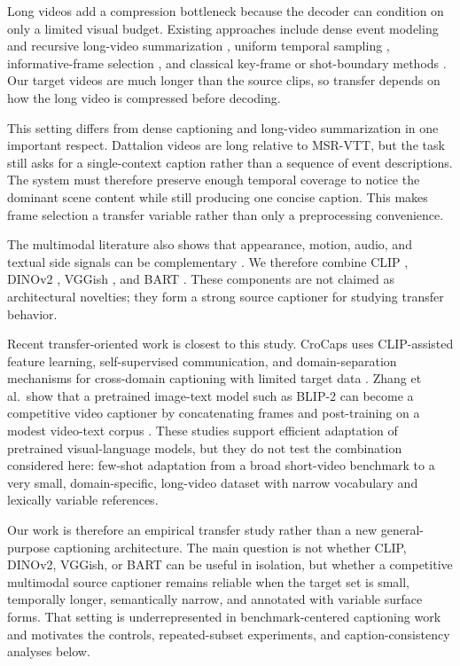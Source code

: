 \documentclass[pdflatex,sn-mathphys-num]{sn-jnl}
\theoremstyle{thmstyleone}
\theoremstyle{thmstyletwo}
\theoremstyle{thmstylethree}
\begin{document}
Long videos add a compression bottleneck because the decoder can condition on only a limited visual budget. Existing approaches include dense event modeling and recursive long-video summarization \cite{Mun_2019_CVPR,yang2023vid2seq,islam2024hourvideo}, uniform temporal sampling \cite{zhou2018maskedtransformer,Mun_2019_CVPR}, informative-frame selection \cite{chen2018lessismore}, and classical key-frame or shot-boundary methods \cite{KFE,shi2017KFE,shotboundary}. Our target videos are much longer than the source clips, so transfer depends on how the long video is compressed before decoding.

This setting differs from dense captioning and long-video summarization in one important respect. Dattalion videos are long relative to MSR-VTT, but the task still asks for a single-context caption rather than a sequence of event descriptions. The system must therefore preserve enough temporal coverage to notice the dominant scene content while still producing one concise caption. This makes frame selection a transfer variable rather than only a preprocessing convenience.

The multimodal literature also shows that appearance, motion, audio, and textual side signals can be complementary \cite{Ramanishka2016,lee2018,iashin2020densevidcap,zhao2022hierarchical,bhooshan2022multimodaltransformer,wang2023threestream}. We therefore combine CLIP \cite{radford2021clip}, DINOv2 \cite{oquab2024dinov2}, VGGish \cite{DBLP_VGGish}, and BART \cite{lewis2020bart}. These components are not claimed as architectural novelties; they form a strong source captioner for studying transfer behavior.

Recent transfer-oriented work is closest to this study. CroCaps uses CLIP-assisted feature learning, self-supervised communication, and domain-separation mechanisms for cross-domain captioning with limited target data \cite{xu2025crocaps}. Zhang et al.\ show that a pretrained image-text model such as BLIP-2 can become a competitive video captioner by concatenating frames and post-training on a modest video-text corpus \cite{zhang2025pretrained}. These studies support efficient adaptation of pretrained visual-language models, but they do not test the combination considered here: few-shot adaptation from a broad short-video benchmark to a very small, domain-specific, long-video dataset with narrow vocabulary and lexically variable references.

Our work is therefore an empirical transfer study rather than a new general-purpose captioning architecture. The main question is not whether CLIP, DINOv2, VGGish, or BART can be useful in isolation, but whether a competitive multimodal source captioner remains reliable when the target set is small, temporally longer, semantically narrow, and annotated with variable surface forms. That setting is underrepresented in benchmark-centered captioning work and motivates the controls, repeated-subset experiments, and caption-consistency analyses below.
\end{document}
